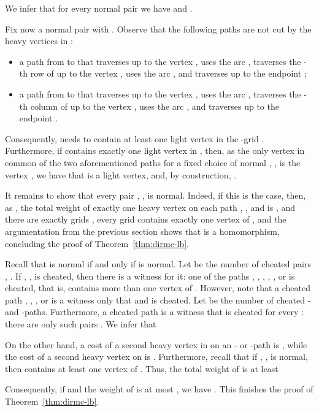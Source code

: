 We infer that for every normal pair  we have  and
.

Fix now a normal pair  with . Observe that the following paths are not cut by the heavy vertices in :
\begin{itemize}
\item a path from  to 
that traverses  up to the vertex , uses the arc ,
traverses the -th row of  up to the vertex , uses the arc , and traverses  up to the endpoint ;
\item a path from  to 
that traverses  up to the vertex , uses the arc ,
traverses the -th column of  up to the vertex , uses the arc , and traverses  up to the endpoint .
\end{itemize}
Consequently,  needs to contain at least one light vertex in the -grid
.
Furthermore, if  contains exactly one light vertex in ,
then, as the only vertex in common of the two aforementioned paths for a fixed choice of normal , , is the vertex ,
we have that  is a light vertex, and, by construction, .

It remains to show that every pair , , is normal.
Indeed, if this is the case, then, as ,
the total weight of exactly one heavy vertex on each path , , and  is ,
and there are exactly  grids , every grid  contains
exactly one vertex of , and the argumentation from the previous section
shows that  is a homomorphism, concluding
the proof of Theorem~\ref{thm:dirmc-lb}.

Recall that  is normal if and only if  is normal.
Let  be the number of cheated pairs , .
If , , is cheated, then there is a witness for it:
one of the paths , , , ,
, or  is cheated, that is, contains more than one vertex of .
However, note that a cheated path , , , or  is a witness only that  and  is cheated.
Let  be the number of cheated - and -paths.
Furthermore, a cheated path  is a witness that  is cheated
for every : there are only  such pairs .
We infer that

On the other hand, 
a cost of a second heavy vertex in  on an - or -path is ,
while the cost of a second heavy vertex on  is .
Furthermore, recall that if , , is normal, then  contains at least one vertex of .
Thus, the total weight of  is at least

Consequently, if  and the weight of  is at most , we have .
This finishes the proof of Theorem~\ref{thm:dirmc-lb}.

